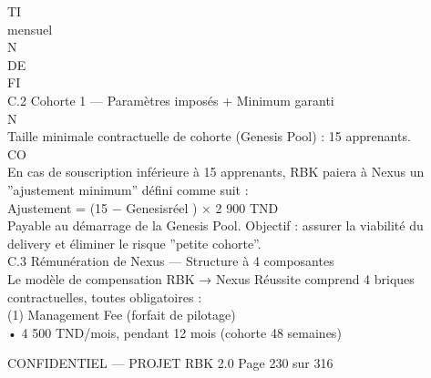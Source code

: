 \vspace{0.5em}
\vspace{0.5em}
\vspace{0.5em}
\vspace{0.5em}
TI\\
mensuel\\
\vspace{0.5em}
\vspace{0.5em}
\vspace{0.5em}
\vspace{0.5em}
N\\
DE\\
FI\\
C.2 Cohorte 1 — Paramètres imposés + Minimum garanti\\
\vspace{0.5em}
\vspace{0.5em}
N\\
Taille minimale contractuelle de cohorte (Genesis Pool) : 15 apprenants.\\
CO\\
En cas de souscription inférieure à 15 apprenants, RBK paiera à Nexus un ”ajustement minimum” défini comme suit :\\
\vspace{0.5em}
\vspace{0.5em}
Ajustement = (15 − Genesisréel ) × 2 900 TND\\
\vspace{0.5em}
Payable au démarrage de la Genesis Pool. Objectif : assurer la viabilité du delivery et éliminer le risque ”petite cohorte”.\\
\vspace{0.5em}
\vspace{0.5em}
\vspace{0.5em}
C.3 Rémunération de Nexus — Structure à 4 composantes\\
Le modèle de compensation RBK → Nexus Réussite comprend 4 briques contractuelles, toutes obligatoires :\\
(1) Management Fee (forfait de pilotage)\\
\vspace{0.5em}
• 4 500 TND/mois, pendant 12 mois (cohorte 48 semaines)\\
\vspace{0.5em}
\vspace{0.5em}
\begin{confidential}CONFIDENTIEL — PROJET RBK 2.0                                            Page 230 sur 316\end{confidential}
